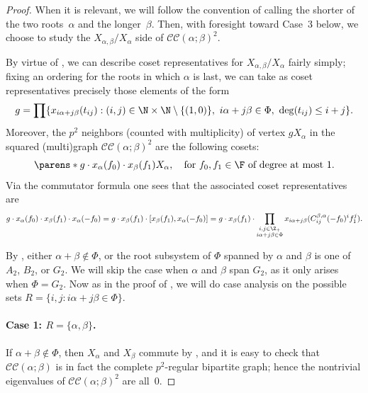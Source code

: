 \documentclass[11pt]{article}
\newcommand{\CC}[2]{\mathcal{C}\mathcal{C}(#1;#2)}
\begin{document}
\begin{proof}
    When it is relevant, we will follow the convention of calling the shorter of the two roots~$\alpha$ and the longer~$\beta$.  
    Then, with foresight toward Case~3 below, we choose to study the $X_{\alpha,\beta}/X_\alpha$ side of $\CC{\alpha}{\beta}^2$.  
    
    By virtue of , we can describe coset representatives for $X_{\alpha,\beta}/X_\alpha$ fairly simply; fixing an ordering for the roots in which $\alpha$ is last, we can take as coset representatives precisely those elements of the form
    \begin{equation}    \label{eqn:coset1}
        g = \prod\{x_{i \alpha + j \beta}(t_{ij}) : (i,j) \in \N \times \N \setminus \{(1,0)\},\ i\alpha+j\beta \in \Phi,\ \deg(t_{ij}) \leq i + j\}.
    \end{equation}
    Moreover, the $p^2$ neighbors (counted with multiplicity) of vertex $gX_\alpha$ in the squared (multi)graph $\CC{\alpha}{\beta}^2$ are the following cosets:
    \[
        \parens*{g \cdot x_{\alpha}(f_0) \cdot x_\beta(f_1)}X_{\alpha}, \quad \text{for } f_0, f_1 \in \F \text{ of degree at most $1$}.
    \]
    Via the commutator formula one sees that the associated coset representatives are
    \begin{equation}    \label{eqn:coset2}
        g \cdot x_{\alpha}(f_0) \cdot x_\beta(f_1) \cdot x_{\alpha}(-f_0)  = g \cdot x_\beta(f_1) \cdot [x_\beta(f_1),x_{\alpha}(-f_0)] = g \cdot x_\beta(f_1) \cdot \prod_{\substack{i,j \in \Z_+ \\ i \alpha + j \beta \in \Phi}} x_{i\alpha+j\beta}(C_{ij}^{\beta,\alpha} (-f_0)^i f_1^j).
    \end{equation}

    By , either $\alpha+\beta \notin \Phi$, or the root subsystem of $\Phi$ spanned by $\alpha$ and $\beta$ is one of $A_2$, $B_2$, or $G_2$. We will skip the case when $\alpha$ and $\beta$ span $G_2$, as it only arises when $\Phi = G_2$. Now as in the proof of , we will do case analysis on the possible sets $R = \{i,j : i\alpha + j\beta \in \Phi\}$.

    \paragraph{Case 1: $R = \{\alpha,\beta\}$.}   If $\alpha+\beta \notin \Phi$, then $X_\alpha$ and $X_\beta$ commute by , and it is easy to check that $\CC{\alpha}{\beta}$ is in fact the complete $p^2$-regular bipartite graph; hence the nontrivial eigenvalues of $\CC{\alpha}{\beta}^2$ are all~$0$.
    

\end{proof}
\end{document}

